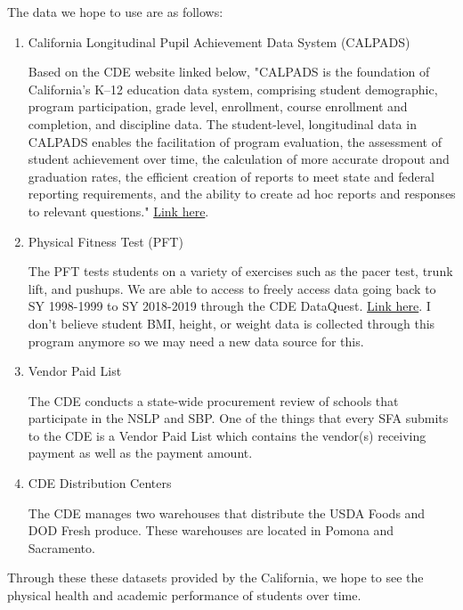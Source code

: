 \documentclass[12pt]{article}
\begin{document}
\begin{enumerate}
	The data we hope to use are as follows:
	
	\begin{enumerate}
		\item California Longitudinal Pupil Achievement Data System (CALPADS)
		
		Based on the CDE website linked below, "CALPADS is the foundation of California’s K–12 education data system, comprising student demographic, program participation, grade level, enrollment, course enrollment and completion, and discipline data. The student-level, longitudinal data in CALPADS enables the facilitation of program evaluation, the assessment of student achievement over time, the calculation of more accurate dropout and graduation rates, the efficient creation of reports to meet state and federal reporting requirements, and the ability to create ad hoc reports and responses to relevant questions." \href{https://www.cde.ca.gov/ds/sp/cl/background.asp}{Link here}.
		
		\item Physical Fitness Test (PFT)
		
		The PFT tests students on a variety of exercises such as the pacer test, trunk lift, and pushups. We are able to access to freely access data going back to SY 1998-1999 to SY 2018-2019 through the CDE DataQuest. \href{https://data1.cde.ca.gov/dataquest/}{Link here}. I don't believe student BMI, height, or weight data is collected through this program anymore so we may need a new data source for this.
		
		\item Vendor Paid List
		
		The CDE conducts a state-wide procurement review of schools that participate in the NSLP and SBP. One of the things that every SFA submits to the CDE is a Vendor Paid List which contains the vendor(s) receiving payment as well as the payment amount. 
		
		\item CDE Distribution Centers
		
		The CDE manages two warehouses that distribute the USDA Foods and DOD Fresh produce. These warehouses are located in Pomona and Sacramento. %
	\end{enumerate}
	
	Through these these datasets provided by the California, we hope to see the physical health and academic performance of students over time.
	
\end{enumerate}
\end{document}
